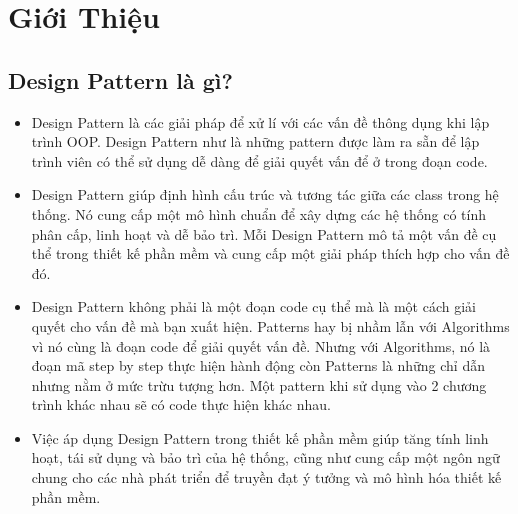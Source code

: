 \section{Giới Thiệu}
\subsection{Design Pattern là gì?}
\begin{itemize}
    \item Design Pattern là các giải pháp để xử lí với các vấn đề thông dụng khi lập trình OOP. Design Pattern như là những pattern được làm ra sẵn để lập trình viên có thể sử dụng dễ dàng để giải quyết vấn để ở trong đoạn code.
    \item Design Pattern giúp định hình cấu trúc và tương tác giữa các class trong hệ thống. Nó cung cấp một mô hình chuẩn để xây dựng các hệ thống có tính phân cấp, linh hoạt và dễ bảo trì. Mỗi Design Pattern mô tả một vấn đề cụ thể trong thiết kế phần mềm và cung cấp một giải pháp thích hợp cho vấn đề đó.
    \item Design Pattern không phải là một đoạn code cụ thể mà là một cách giải quyết cho vấn đề mà bạn xuất hiện. Patterns hay bị nhầm lẫn với Algorithms vì nó cùng là đoạn code để giải quyết vấn đề. Nhưng với Algorithms, nó là đoạn mã step by step thực hiện hành động còn Patterns là những chỉ dẫn nhưng nằm ở mức trừu tượng hơn. Một pattern khi sử dụng vào 2 chương trình khác nhau sẽ có code thực hiện khác nhau.
    \item Việc áp dụng Design Pattern trong thiết kế phần mềm giúp tăng tính linh hoạt, tái sử dụng và bảo trì của hệ thống, cũng như cung cấp một ngôn ngữ chung cho các nhà phát triển để truyền đạt ý tưởng và mô hình hóa thiết kế phần mềm.
\end{itemize}
